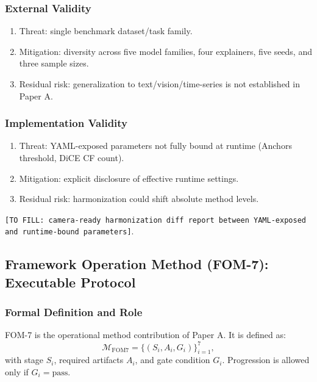 \documentclass[twoside,11pt]{article}
\begin{document}
\subsubsection{External Validity}
\begin{enumerate}[leftmargin=*]
    \item Threat: single benchmark dataset/task family.
    \item Mitigation: diversity across five model families, four explainers, five seeds, and three sample sizes.
    \item Residual risk: generalization to text/vision/time-series is not established in Paper A.
\end{enumerate}

\subsubsection{Implementation Validity}
\begin{enumerate}[leftmargin=*]
    \item Threat: YAML-exposed parameters not fully bound at runtime (Anchors threshold, DiCE CF count).
    \item Mitigation: explicit disclosure of effective runtime settings.
    \item Residual risk: harmonization could shift absolute method levels.
\end{enumerate}
\texttt{[TO FILL: camera-ready harmonization diff report between YAML-exposed and runtime-bound parameters]}.

\subsection{Framework Operation Method (FOM-7): Executable Protocol}
\subsubsection{Formal Definition and Role}
FOM-7 is the operational method contribution of Paper A. It is defined as:
\[
\mathcal{M}_{\mathrm{FOM7}}=\{(S_i,A_i,G_i)\}_{i=1}^{7},
\]
with stage $S_i$, required artifacts $A_i$, and gate condition $G_i$.
Progression is allowed only if $G_i=\mathrm{pass}$.
\end{document}
